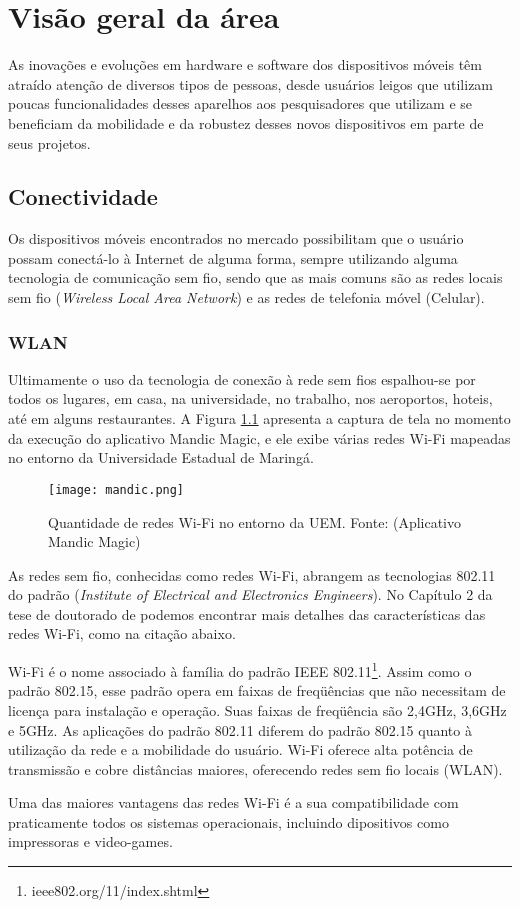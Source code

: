 \chapter{Visão geral da área}\label{cha:visaogeral}

As inovações e evoluções em hardware e software dos dispositivos móveis têm atraído atenção de diversos tipos de pessoas, desde usuários leigos que utilizam poucas funcionalidades desses aparelhos aos pesquisadores que utilizam e se beneficiam da mobilidade e da robustez desses novos dispositivos em parte de seus projetos.

\section{Conectividade}
Os dispositivos móveis encontrados no mercado possibilitam que o usuário possam conectá-lo à Internet de alguma forma, sempre utilizando alguma tecnologia de comunicação sem fio, sendo que as mais comuns são as redes locais sem fio  (\textit{Wireless Local Area Network}) e as redes de telefonia móvel (Celular).
\subsection{WLAN}
Ultimamente o uso da tecnologia de conexão à rede sem fios espalhou-se por todos os lugares, em casa, na universidade, no trabalho, nos aeroportos, hoteis, até em alguns restaurantes. A Figura \ref{fig:mandic} apresenta a captura de tela no momento da execução do aplicativo Mandic Magic, e ele exibe várias redes Wi-Fi mapeadas no entorno da Universidade Estadual de Maringá.

\begin{figure}[!htb]
	\centering
	\texttt{[image: mandic.png]} %
	\caption[Quantidade de redes Wi-Fi no entorno da UEM]{Quantidade de redes Wi-Fi no entorno da UEM. Fonte: (Aplicativo Mandic Magic)}
	\label{fig:mandic}
\end{figure}

As redes sem fio, conhecidas como redes Wi-Fi, abrangem as tecnologias 802.11 do padrão  (\textit{Institute of Electrical and Electronics Engineers}). No Capítulo 2 da tese de doutorado de \cite{vanni09} podemos encontrar mais detalhes das características das redes Wi-Fi, como na citação abaixo.
\begin{citacao}
Wi-Fi é o nome associado à família do padrão IEEE 802.11\footnote{ieee802.org/11/index.shtml}. Assim como o
padrão 802.15, esse padrão opera em faixas de freqüências que não necessitam de licença para instalação e operação. Suas faixas de freqüência são 2,4GHz, 3,6GHz e 5GHz. As aplicações do padrão 802.11 diferem do padrão 802.15 quanto à utilização da rede e a mobilidade do usuário. Wi-Fi oferece alta potência de transmissão e cobre distâncias maiores, oferecendo redes sem fio locais (WLAN). \cite{vanni09}
\end{citacao}
Uma das maiores vantagens das redes Wi-Fi é a sua compatibilidade com praticamente todos os sistemas operacionais, incluindo dipositivos como impressoras e video-games.

